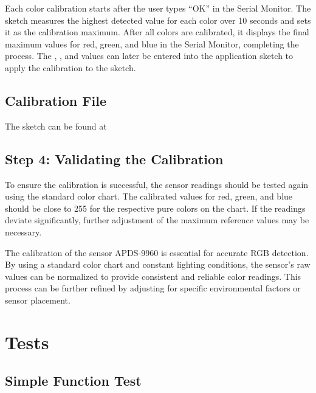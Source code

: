 
\bigskip

Each color calibration starts after the user types ``OK'' in the Serial Monitor. The sketch measures the highest detected value for each color over 10 seconds and sets it as the calibration maximum. After all colors are calibrated, it displays the final maximum values for red, green, and blue in the Serial Monitor, completing the process. The , , and  values can later be entered into the application sketch to apply the calibration to the sketch.


\subsection{Calibration File}

The sketch can be found at 

\bigskip

{
}


\subsection{Step 4: Validating the Calibration}

To ensure the calibration is successful, the sensor readings should be tested again using the standard color chart. The calibrated values for red, green, and blue should be close to 255 for the respective pure colors on the chart. If the readings deviate significantly, further adjustment of the maximum reference values may be necessary.

\bigskip

The calibration of the sensor APDS-9960 is essential for accurate RGB detection. By using a standard color chart and constant lighting conditions, the sensor's raw values can be normalized to provide consistent and reliable color readings. This process can be further refined by adjusting for specific environmental factors or sensor placement.


\section{Tests}

\subsection{Simple Function Test}

